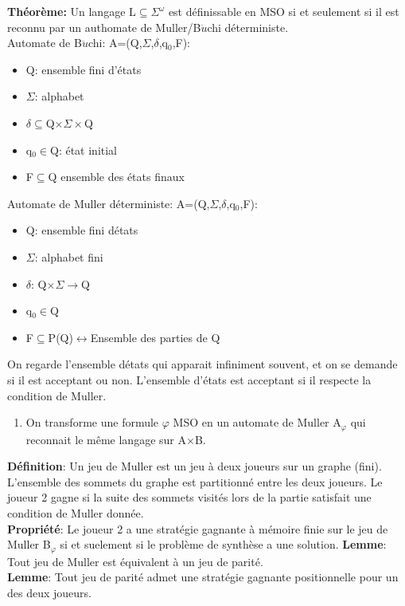 \medskip
\textbf{Th\'eor\`eme:} Un langage L$\subseteq\Sigma^\omega$ est d\'efinissable en MSO si et seulement si il
est reconnu par un authomate de Muller/B$\ddot{u}$chi d\'eterministe.\\
Automate de B$\ddot{u}$chi: A=(Q,$\Sigma$,$\delta$,q$_0$,F):
\begin{itemize}
  \item Q: ensemble fini d'\'etats
  \item $\Sigma$: alphabet
  \item $\delta\subseteq$Q$\times\Sigma\times$Q
  \item q$_0\in$Q: \'etat initial
  \item F$\subseteq$Q ensemble des \'etats finaux
\end{itemize}
\medskip
Automate de Muller d\'eterministe: A=(Q,$\Sigma$,$\delta$,q$_0$,F):
\begin{itemize}
  \item Q: ensemble fini d\'etats
  \item $\Sigma$: alphabet fini
  \item $\delta$: Q$\times\Sigma\rightarrow$Q
  \item q$_0\in$Q
  \item F$\subseteq$P(Q)$\leftrightarrow$Ensemble des parties de Q
\end{itemize}
On regarde l'ensemble d\'etats qui apparait infiniment souvent, et on se demande si il est acceptant ou non.
L'ensemble d'\'etats est acceptant si il respecte la condition de Muller.
\medskip
\begin{enumerate}
  \item On transforme une formule $\varphi$ MSO en un automate de Muller A$_\varphi$ qui reconnait le m\^eme
  langage sur A$\times$B.
\end{enumerate}
\medskip
\textbf{D\'efinition}: Un jeu de Muller est un jeu \`a deux joueurs sur un graphe (fini). L'ensemble des sommets du
graphe est partitionn\'e entre les deux joueurs. Le joueur 2 gagne si la suite des sommets visit\'es lors de la
partie satisfait une condition de Muller donn\'ee.\\
\textbf{Propri\'et\'e}: Le joueur 2 a une strat\'egie gagnante \`a m\'emoire finie sur le jeu de Muller
B$_\varphi$ si et suelement si le probl\`eme de synth\`ese a une solution.
\medskip
\textbf{Lemme}: Tout jeu de Muller est \'equivalent \`a un jeu de parit\'e.\\
\textbf{Lemme}: Tout jeu de parit\'e admet une strat\'egie gagnante positionnelle pour un des deux joueurs.
